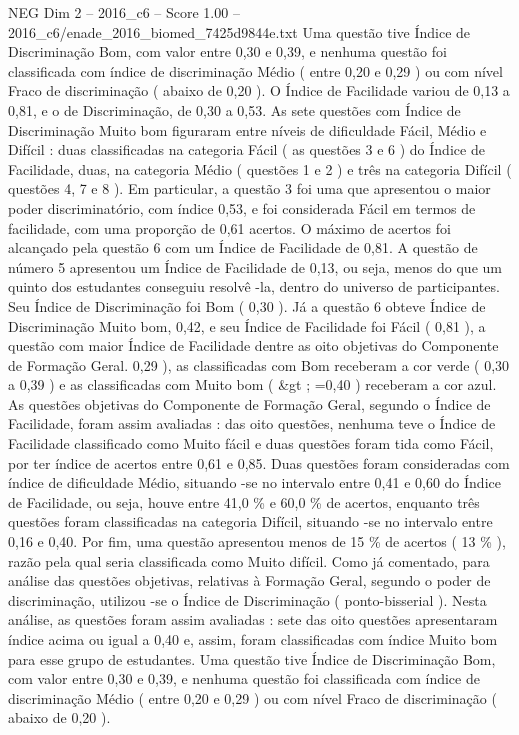 \begin{textsample}{NEG Dim 2 – 2016\_c6 – Score 1.00 – 2016\_c6/enade\_2016\_biomed\_7425d9844e.txt}
Uma questão tive Índice de Discriminação Bom, com valor entre 0,30 e 0,39, e nenhuma questão foi classificada com índice de discriminação Médio ( entre 0,20 e 0,29 ) ou com nível Fraco de discriminação ( abaixo de 0,20 ).
O Índice de Facilidade variou de 0,13 a 0,81, e o de Discriminação, de 0,30 a 0,53.
As sete questões com Índice de Discriminação Muito bom figuraram entre níveis de dificuldade Fácil, Médio e Difícil : duas classificadas na categoria Fácil ( as questões 3 e 6 ) do Índice de Facilidade, duas, na categoria Médio ( questões 1 e 2 ) e três na categoria Difícil ( questões 4, 7 e 8 ).
Em particular, a questão 3 foi uma que apresentou o maior poder discriminatório, com índice 0,53, e foi considerada Fácil em termos de facilidade, com uma proporção de 0,61 acertos.
O máximo de acertos foi alcançado pela questão 6 com um Índice de Facilidade de 0,81.
A questão de número 5 apresentou um Índice de Facilidade de 0,13, ou seja, menos do que um quinto dos estudantes conseguiu resolvê -la, dentro do universo de participantes.
Seu Índice de Discriminação foi Bom ( 0,30 ).
Já a questão 6 obteve Índice de Discriminação Muito bom, 0,42, e seu Índice de Facilidade foi Fácil ( 0,81 ), a questão com maior Índice de Facilidade dentre as oito objetivas do Componente de Formação Geral. 0,29 ), as classificadas com Bom receberam a cor verde ( 0,30 a 0,39 ) e as classificadas com Muito bom ( \&gt ; =0,40 ) receberam a cor azul.
As questões objetivas do Componente de Formação Geral, segundo o Índice de Facilidade, foram assim avaliadas : das oito questões, nenhuma teve o Índice de Facilidade classificado como Muito fácil e duas questões foram tida como Fácil, por ter índice de acertos entre 0,61 e 0,85.
Duas questões foram consideradas com índice de dificuldade Médio, situando -se no intervalo entre 0,41 e 0,60 do Índice de Facilidade, ou seja, houve entre 41,0 \% e 60,0 \% de acertos, enquanto três questões foram classificadas na categoria Difícil, situando -se no intervalo entre 0,16 e 0,40.
Por fim, uma questão apresentou menos de 15 \% de acertos ( 13 \% ), razão pela qual seria classificada como Muito difícil.
Como já comentado, para análise das questões objetivas, relativas à Formação Geral, segundo o poder de discriminação, utilizou -se o Índice de Discriminação ( ponto-bisserial ).
Nesta análise, as questões foram assim avaliadas : sete das oito questões apresentaram índice acima ou igual a 0,40 e, assim, foram classificadas com índice Muito bom para esse grupo de estudantes.
Uma questão tive Índice de Discriminação Bom, com valor entre 0,30 e 0,39, e nenhuma questão foi classificada com índice de discriminação Médio ( entre 0,20 e 0,29 ) ou com nível Fraco de discriminação ( abaixo de 0,20 ).

\end{textsample}
